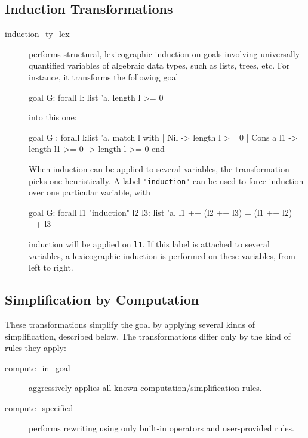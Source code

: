 \subsection{Induction Transformations}

\begin{description}
\item[induction\_ty\_lex]
  performs structural, lexicographic induction on
  goals involving universally quantified variables of algebraic data
  types, such as lists, trees, etc. For instance, it transforms the
  following goal
\begin{whycode}
goal G: forall l: list 'a. length l >= 0
\end{whycode}
  into this one:
\begin{whycode}
goal G :
  forall l:list 'a.
     match l with
     | Nil -> length l >= 0
     | Cons a l1 -> length l1 >= 0 -> length l >= 0
     end
\end{whycode}
  When induction can be applied to several variables, the transformation
  picks one heuristically. A label \verb|"induction"| can be used to
  force induction over one particular variable, \eg with
\begin{whycode}
goal G: forall l1 "induction" l2 l3: list 'a.
        l1 ++ (l2 ++ l3) = (l1 ++ l2) ++ l3
\end{whycode}
induction will be applied on \verb|l1|. If this label is attached to
several variables, a lexicographic induction is performed on these
variables, from left to right.




\end{description}

\subsection{Simplification by Computation}

These transformations simplify the goal by applying several kinds of
simplification, described below. The transformations differ only by
the kind of rules they apply:
\begin{description}
\item[compute\_in\_goal] aggressively applies all known
  computation/simplification rules.

\item[compute\_specified] performs rewriting using only built-in
  operators and user-provided rules.
\end{description}

